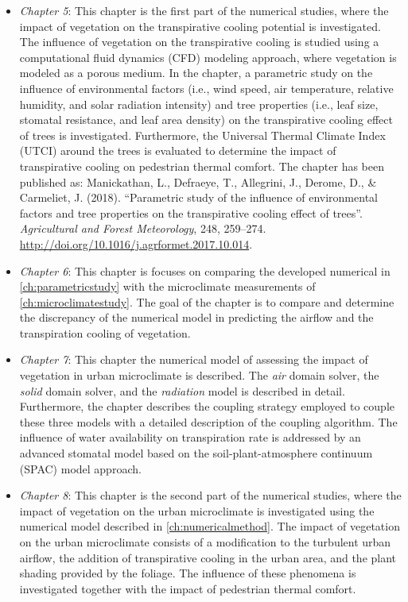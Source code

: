 \begin{itemize}
	\item \textit{Chapter 5}: This chapter is the first part of the numerical studies, where the impact of vegetation on the transpirative cooling potential is investigated. The influence of vegetation on the transpirative cooling is studied using a computational fluid dynamics (CFD) modeling approach, where vegetation is modeled as a porous medium. In the chapter, a parametric study on the influence of environmental factors (i.e., wind speed, air temperature, relative humidity, and solar radiation intensity) and tree properties (i.e., leaf size, stomatal resistance, and leaf area density) on the transpirative cooling effect of trees is investigated. Furthermore, the Universal Thermal Climate Index (UTCI) around the trees is evaluated to determine the impact of transpirative cooling on pedestrian thermal comfort. The chapter has been published as: Manickathan, L., Defraeye, T., Allegrini, J., Derome, D., \& Carmeliet, J. (2018). ``Parametric study of the influence of environmental factors and tree properties on the transpirative cooling effect of trees''. \textit{Agricultural and Forest Meteorology}, 248, 259–274. \url{http://doi.org/10.1016/j.agrformet.2017.10.014}.

	\item \textit{Chapter 6}: This chapter is focuses on comparing the developed numerical in \cref{ch:parametricstudy} with the microclimate measurements of \cref{ch:microclimatestudy}. The goal of the chapter is to compare and determine the discrepancy of the numerical model in predicting the airflow and the transpiration cooling of vegetation. 

	\item \textit{Chapter 7}: This chapter the numerical model of assessing the impact of vegetation in urban microclimate is described. The \textit{air} domain solver, the \textit{solid} domain solver, and the \textit{radiation} model is described in detail. Furthermore, the chapter describes the coupling strategy employed to couple these three models with a detailed description of the coupling algorithm. The influence of water availability on transpiration rate is addressed by an advanced stomatal model based on the soil-plant-atmosphere continuum (SPAC) model approach. 

	\item \textit{Chapter 8}: This chapter is the second part of the numerical studies, where the impact of vegetation on the urban microclimate is investigated using the numerical model described in \cref{ch:numericalmethod}. The impact of vegetation on the urban microclimate consists of a modification to the turbulent urban airflow, the addition of transpirative cooling in the urban area, and the plant shading provided by the foliage. The influence of these phenomena is investigated together with the impact of pedestrian thermal comfort. 


\end{itemize}
